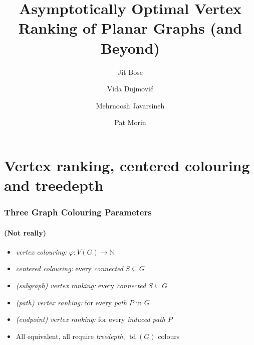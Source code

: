 \documentclass[xcolor=dvipsnames]{beamer}
\title[$\ell$-vertex ranking]{Asymptotically Optimal Vertex Ranking \newline of Planar Graphs (and Beyond)}
\author[Bose, Dujmović, Javarsineh, M]{Jit Bose \and Vida Dujmović \and Mehrnoosh Javarsineh \and Pat Morin}
\newcommand{\N}{\mathbb{N}}
\DeclareMathOperator{\td}{td}
\begin{document}
\begin{frame}
  \titlepage
\end{frame}

%


\section{Vertex ranking, centered colouring and treedepth}

\begin{frame}
  \frametitle{Three Graph Colouring Parameters}
  \framesubtitle{(Not really)}



  \begin{itemize}[<+->]
    \item \emph{vertex colouring:} $\varphi:V(G)\to\N$\vspace{.5cm}
    \begin{center}
    \end{center}

    \item \emph{centered colouring:} every \emph{connected} $S\subseteq G$%

    \item \emph{(subgraph) vertex ranking:} every \emph{connected} $S\subseteq G$%

    \item \emph{(path) vertex ranking:} for every \emph{path} $P$ in $G$%

    \item \emph{(endpoint) vertex ranking:} for every \emph{induced path} $P$%

    \item All equivalent, all require \emph{treedepth}, $\td(G)$ colours
  \end{itemize}
\end{frame}
\end{document}

